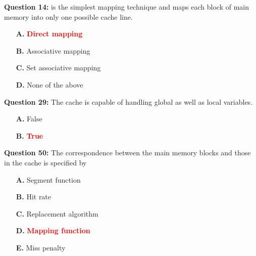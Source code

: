 \documentclass[12pt,a4paper]{article}
\begin{document}
\vspace{0.5cm}

\vspace{0.5cm}

\textbf{Question 14:} \underline{\hspace{1.5cm}} is the simplest mapping technique and maps each block of main memory into only one possible cache line.

\begin{itemize}
    \item[\textbf{A.}] \textcolor{red}{\textbf{Direct mapping}}
    \item[\textbf{B.}] Associative mapping
    \item[\textbf{C.}] Set associative mapping
    \item[\textbf{D.}] None of the above
\end{itemize}

\vspace{0.5cm}

\vspace{0.5cm}

\textbf{Question 29:} The cache is capable of handling global as well as local variables.

\begin{itemize}
    \item[\textbf{A.}] False
    \item[\textbf{B.}] \textcolor{red}{\textbf{True}}
\end{itemize}

\vspace{0.5cm}

\vspace{0.5cm}

\textbf{Question 50:} The correspondence between the main memory blocks and those in the cache is specified by

\begin{itemize}
    \item[\textbf{A.}] Segment function
    \item[\textbf{B.}] Hit rate
    \item[\textbf{C.}] Replacement algorithm
    \item[\textbf{D.}] \textcolor{red}{\textbf{Mapping function}}
    \item[\textbf{E.}] Miss penalty
\end{itemize}

\vspace{0.5cm}

\vspace{0.5cm}
\end{document}

